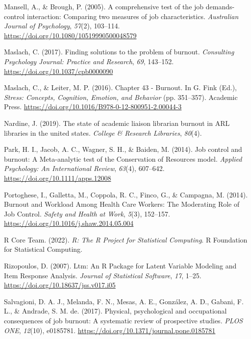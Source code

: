 \documentclass[
  twocolumn]{article}
\newlength{\cslhangindent}
\newenvironment{CSLReferences}[2] %
 {\begin{list}{}{%
  \setlength{\itemindent}{0pt}
  \setlength{\leftmargin}{0pt}
  \setlength{\parsep}{0pt}
  \ifodd #1
   \setlength{\leftmargin}{\cslhangindent}
   \setlength{\itemindent}{-1\cslhangindent}
  \fi
  \setlength{\itemsep}{#2\baselineskip}}}
 {\end{list}}
\begin{document}
\begin{CSLReferences}{1}{0}
Mansell, A., \& Brough, P. (2005). A comprehensive test of the job
demands-control interaction: {Comparing} two measures of job
characteristics. \emph{Australian Journal of Psychology}, \emph{57}(2),
103--114. \url{https://doi.org/10.1080/10519990500048579}

Maslach, C. (2017). Finding solutions to the problem of burnout.
\emph{Consulting Psychology Journal: Practice and Research}, \emph{69},
143--152. \url{https://doi.org/10.1037/cpb0000090}

Maslach, C., \& Leiter, M. P. (2016). Chapter 43 - {Burnout}. In G. Fink
(Ed.), \emph{Stress: {Concepts}, {Cognition}, {Emotion}, and {Behavior}}
(pp. 351--357). Academic Press.
\url{https://doi.org/10.1016/B978-0-12-800951-2.00044-3}

Nardine, J. (2019). The state of academic liaison librarian burnout in
{ARL} libraries in the united states. \emph{College \& Research
Libraries}, \emph{80}(4).

Park, H. I., Jacob, A. C., Wagner, S. H., \& Baiden, M. (2014). Job
control and burnout: {A Meta}-analytic test of the {Conservation} of
{Resources} model. \emph{Applied Psychology: An International Review},
\emph{63}(4), 607--642. \url{https://doi.org/10.1111/apps.12008}

Portoghese, I., Galletta, M., Coppola, R. C., Finco, G., \& Campagna, M.
(2014). Burnout and {Workload Among Health Care Workers}: {The
Moderating Role} of {Job Control}. \emph{Safety and Health at Work},
\emph{5}(3), 152--157. \url{https://doi.org/10.1016/j.shaw.2014.05.004}

R Core Team. (2022). \emph{R: {The R Project} for {Statistical
Computing}}. R Foundation for Statistical Computing.

Rizopoulos, D. (2007). Ltm: {An R Package} for {Latent Variable
Modeling} and {Item Response Analysis}. \emph{Journal of Statistical
Software}, \emph{17}, 1--25. \url{https://doi.org/10.18637/jss.v017.i05}

Salvagioni, D. A. J., Melanda, F. N., Mesas, A. E., González, A. D.,
Gabani, F. L., \& Andrade, S. M. de. (2017). Physical, psychological and
occupational consequences of job burnout: {A} systematic review of
prospective studies. \emph{PLOS ONE}, \emph{12}(10), e0185781.
\url{https://doi.org/10.1371/journal.pone.0185781}


\end{CSLReferences}
\end{document}
